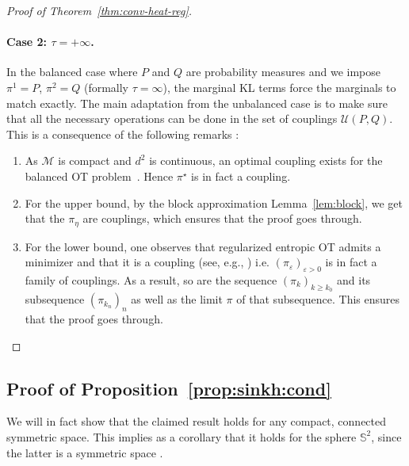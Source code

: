 \documentclass{article}
\theoremstyle{plain}
\theoremstyle{definition}
\theoremstyle{remark}
\renewcommand{\S}{\ensuremath{\mathbb{S}}}
\newcommand{\M}{\ensuremath{\mathcal{M}}}
\newcommand{\U}{\ensuremath{\mathcal{U}}}
\begin{document}
\begin{proof}[Proof of Theorem~\ref{thm:conv-heat-reg}]
\paragraph{Case 2: $\tau = + \infty$.}
In the balanced case where $P$ and $Q$ are probability measures and we impose $\pi^1 = P$, $\pi^2 = Q$ (formally $\tau = \infty$), the marginal KL terms force the marginals to match exactly. The main adaptation from the unbalanced case is to make sure that all the necessary operations can be done in the set of couplings $\U(P,Q)$. This is a consequence of the following remarks :
\begin{enumerate}
	\item As $\M$ is compact and $d^2$ is continuous, an optimal coupling exists for the balanced OT problem~\cite[Thm.~1.4]{santambrogio2015optimal}. Hence $\pi^{\star}$ is in fact a coupling.
	\item For the upper bound, by the block approximation Lemma~\ref{lem:block}, we get that the $\pi_{\eta}$ are couplings, which ensures that the proof goes through.
	\item For the lower bound, one observes that regularized entropic OT admits a minimizer and that it is a coupling (see, e.g., \cite[Theorem 4.2]{nutz2021introduction}) i.e. $(\pi_{\varepsilon})_{\varepsilon > 0}$ is in fact a family of couplings. As a result, so are the sequence $(\pi_{k})_{k \ge k_{0}}$ and its subsequence $(\pi_{k_{n}})_{n}$ as well as the limit $\pi$ of that subsequence. This ensures that the proof goes through.
\end{enumerate}
\end{proof}

\subsection{Proof of Proposition~\ref{prop:sinkh:cond}}\label{app:proof:sinkh-cond}

We will in fact show that the claimed result holds for any compact, connected symmetric space. This implies as a corollary that it holds for the sphere $\S^2$, since the latter is a symmetric space \cite{helgason1979differential, eschenburg1997lecture}.
\end{document}
